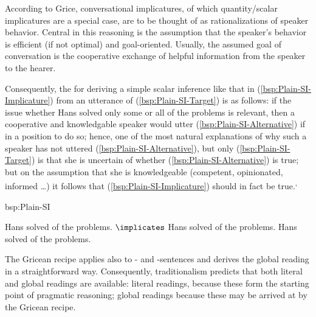 \documentclass[fleqn,reqno,10pt,draft]{article}
\newcommand{\as}{\acro{as}}
\renewcommand{\es}{\acro{es}}
\begin{document}
According to Grice, conversational implicatures, of which
quantity/scalar implicatures are a special case, are to be thought of
as rationalizations of speaker behavior. Central in this reasoning is
the assumption that the speaker's behavior is efficient (if not
optimal) and goal-oriented. Usually, the assumed goal of conversation
is the cooperative exchange of helpful information from the speaker to
the hearer.

Consequently, the 
\citep[c.f.][]{Geurts2010:Quantity-Implic} for deriving a simple
scalar inference like that in (\ref{bsp:Plain-SI-Implicature}) from an
utterance of (\ref{bsp:Plain-SI-Target}) is as follows: if the issue
whether Hans solved only some or all of the problems is relevant, then
a cooperative and knowledgable speaker would utter
(\ref{bsp:Plain-SI-Alternative}) if in a position to do so; hence, one
of the most natural explanations of why such a speaker has not uttered
(\ref{bsp:Plain-SI-Alternative}), but only (\ref{bsp:Plain-SI-Target})
is that she is uncertain of whether (\ref{bsp:Plain-SI-Alternative})
is true; but on the assumption that she is knowledgeable (competent,
opinionated, informed \dots) it follows that
(\ref{bsp:Plain-SI-Implicature}) should in fact be true.\textsuperscript{,}

\begin{exer}{bsp:Plain-SI}
  \ex 
    \begin{xlist}
      \ex \label{bsp:Plain-SI-Target} Hans solved  of the problems.
      \ex \label{bsp:Plain-SI-Implicature} $\implicates$ Hans solved
         of the problems.
      \ex  \label{bsp:Plain-SI-Alternative}  Hans solved  of the problems.
    \end{xlist}
\end{exer}

The Gricean recipe applies also to \as- and \es-sentences and derives
the global reading in a straightforward way. Consequently,
traditionalism predicts that both literal and global readings are
available: literal readings, because these form the starting point of
pragmatic reasoning; global readings because these may be arrived at
by the Gricean recipe. 
\end{document}
